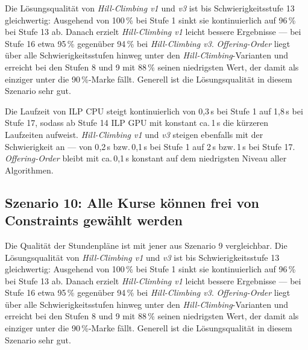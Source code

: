 Die Lösungsqualität von \textit{Hill-Climbing v1} und \textit{v3} ist bis Schwierigkeitsstufe
13 gleichwertig: Ausgehend von 100\,\% bei Stufe 1 sinkt sie kontinuierlich auf 96\,\% bei
Stufe 13 ab. Danach erzielt \textit{Hill-Climbing v1} leicht bessere Ergebnisse --- bei Stufe
16 etwa 95\,\% gegenüber 94\,\% bei \textit{Hill-Climbing v3}. \textit{Offering-Order} liegt
über alle Schwierigkeitsstufen hinweg unter den \textit{Hill-Climbing}-Varianten und erreicht
bei den Stufen 8 und 9 mit 88\,\% seinen niedrigsten Wert, der damit als einziger unter die
90\,\%-Marke fällt. Generell ist die Lösungsqualität in diesem Szenario sehr gut.

\vspace{1cm}

\newpage

Die Laufzeit von ILP CPU steigt kontinuierlich von 0{,}3\,s bei Stufe 1 auf 1{,}8\,s bei
Stufe 17, sodass ab Stufe 14 ILP GPU mit konstant ca.\,1\,s die kürzeren Laufzeiten aufweist.
\textit{Hill-Climbing v1} und \textit{v3} steigen ebenfalls mit der Schwierigkeit an --- von
0{,}2\,s bzw.\,0{,}1\,s bei Stufe 1 auf 2\,s bzw.\,1\,s bei Stufe 17. \textit{Offering-Order}
bleibt mit ca.\,0{,}1\,s konstant auf dem niedrigsten Niveau aller Algorithmen.

\vspace{1cm}

\newpage


\subsection{Szenario 10: Alle Kurse können frei von Constraints gewählt werden}

Die Qualität der Stundenpläne ist mit jener aus Szenario 9 vergleichbar. Die Lösungsqualität von \textit{Hill-Climbing v1} und \textit{v3} ist bis Schwierigkeitsstufe
13 gleichwertig: Ausgehend von 100\,\% bei Stufe 1 sinkt sie kontinuierlich auf 96\,\% bei
Stufe 13 ab. Danach erzielt \textit{Hill-Climbing v1} leicht bessere Ergebnisse --- bei Stufe
16 etwa 95\,\% gegenüber 94\,\% bei \textit{Hill-Climbing v3}. \textit{Offering-Order} liegt
über alle Schwierigkeitsstufen hinweg unter den \textit{Hill-Climbing}-Varianten und erreicht
bei den Stufen 8 und 9 mit 88\,\% seinen niedrigsten Wert, der damit als einziger unter die
90\,\%-Marke fällt. Generell ist die Lösungsqualität in diesem Szenario sehr gut.


